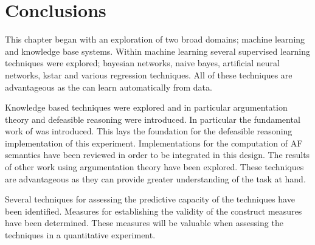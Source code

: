 \section{Conclusions}

This chapter began with an exploration of two broad domains; machine learning and knowledge base systems. Within machine learning several supervised learning techniques were explored; bayesian networks, naive bayes, artificial neural networks, kstar and various regression techniques. All of these techniques are advantageous as the can learn automatically from data. 

Knowledge based techniques were explored and in particular argumentation theory and defeasible reasoning were introduced. In particular the fundamental work of \cite{dung1995acceptability} was introduced. This lays the foundation for the defeasible reasoning implementation of this experiment. Implementations for the computation of AF semantics have been reviewed in order to be integrated in this design. The results of other work using argumentation theory have been explored. These techniques are advantageous as they can provide greater understanding of the task at hand.

Several techniques for assessing the predictive capacity of the techniques have been identified. Measures for establishing the validity of the construct measures have been determined. These measures will be valuable when assessing the techniques in a quantitative experiment.
